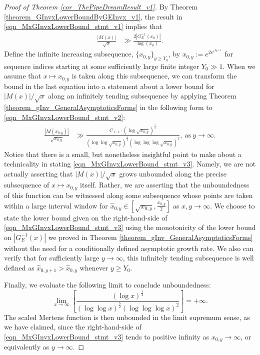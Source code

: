 \documentclass[11pt,reqno,a4letter]{article}
\numberwithin{figure}{section}
\numberwithin{table}{section}
\theoremstyle{plain}
\numberwithin{theorem}{section}
\theoremstyle{definition}
\begin{document}
\begin{proof}[Proof of Theorem \ref{cor_ThePipeDreamResult_v1}]
By Theorem \ref{theorem_GInvxLowerBoundByGEInvx_v1}, the result in 
\eqref{eqn_MxGInvxLowerBound_stmt_v1} implies that 
\begin{align} 
\label{eqn_MxGInvxLowerBound_stmt_v2} 
\frac{|M(x)|}{\sqrt{x}} & \gg \frac{2 \left\lvert G_{E}^{-1}(x_0) \right\rvert}{\log\left(x_0\right)}. 
\end{align} 
Define the infinite increasing subsequence, 
$\{x_{0,y}\}_{y \geq Y_0}$, by $x_{0,y} := e^{2e^{e^{2y+1}}}$ for sequence indices 
starting at some sufficiently 
large finite integer $Y_0 \gg 1$. 
When we assume that $x \mapsto x_{0,y}$ is taken along this subsequence, 
we can transform the bound in the last 
equation into a statement about a lower bound for $|M(x)| / \sqrt{x}$ 
along an infinitely tending subsequence by 
applying Theorem \ref{theorem_gInv_GeneralAsymptoticsForms} in the following form to 
\eqref{eqn_MxGInvxLowerBound_stmt_v2}: 
\begin{align} 
\label{eqn_MxGInvxLowerBound_stmt_v3} 
\frac{|M(x_{0,y})|}{\sqrt{x_{0,y}}} & \gg 
     \frac{C_{\ell,1} \cdot (\log \sqrt{x_{0,y}})^{\frac{1}{4}}}{ 
     (\log\log \sqrt{x_{0,y}})^{\frac{5}{2}} (\log\log\log \sqrt{x_{0,y}})^2}, 
     \mathrm{\ as\ } y \rightarrow \infty. 
\end{align} 
Notice that there is a small, but nonetheless insightful point to make about a 
technicality in stating \eqref{eqn_MxGInvxLowerBound_stmt_v3}. 
Namely, we are not actually asserting that 
$|M(x)| / \sqrt{x}$ grows unbounded along the precise subsequence of 
$x \mapsto x_{0,y}$ itself. Rather, we are asserting that the unboundedness of this function 
can be witnessed along some subsequence whose points are taken within a 
large interval window for 
$\hat{x}_{0,y} \in \left[\sqrt{x_{0,y}}, \frac{x_{0,y}}{2}\right]$ as 
$x,y \rightarrow \infty$. 
We choose to state the lower bound given on the right-hand-side of 
\eqref{eqn_MxGInvxLowerBound_stmt_v3} using the 
monotonicity of the lower bound on $|G_E^{-1}(x)|$ we proved in 
Theorem \ref{theorem_gInv_GeneralAsymptoticsForms} without the need for a conditionally 
defined asymptotic growth rate. 
We also can verify that for sufficiently large $y \rightarrow \infty$, this infinitely 
tending subsequence is well defined as $\hat{x}_{0,y+1} > \hat{x}_{0,y}$ whenever $y \geq Y_0$. 

Finally, we evaluate the following limit to conclude unboundedness: 
\[
\lim_{x \rightarrow \infty} \left[\frac{(\log x)^{\frac{1}{4}}}{ 
     (\log\log x)^{\frac{5}{2}} (\log\log\log x)^2}  
     \right] = +\infty. 
\]
The scaled Mertens function is then 
unbounded in the limit supremum sense, as we have claimed, since the right-hand-side of 
\eqref{eqn_MxGInvxLowerBound_stmt_v3} tends to positive infinity as 
$x_{0,y} \rightarrow \infty$, or equivalently as $y \rightarrow \infty$. 
\end{proof} 
\end{document}
